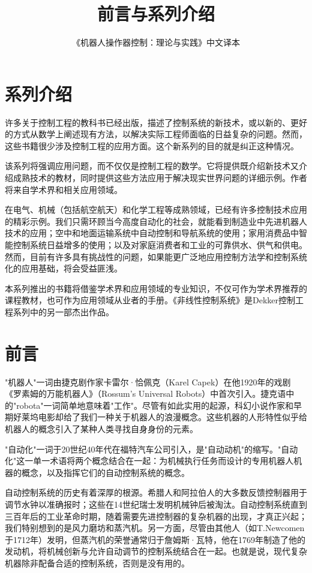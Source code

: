 \documentclass[UTF8,a4paper]{ctexart}
\title{前言与系列介绍}
\author{《机器人操作器控制：理论与实践》中文译本}
\date{}
\begin{document}
  \maketitle
\fi

\section{系列介绍}

许多关于控制工程的教科书已经出版，描述了控制系统的新技术，或以新的、更好的方式从数学上阐述现有方法，以解决实际工程师面临的日益复杂的问题。然而，这些书籍很少涉及控制工程的应用方面。这个新系列的目的就是纠正这种情况。

该系列将强调应用问题，而不仅仅是控制工程的数学。它将提供既介绍新技术又介绍成熟技术的教材，同时提供这些方法应用于解决现实世界问题的详细示例。作者将来自学术界和相关应用领域。

在电气、机械（包括航空航天）和化学工程等成熟领域，已经有许多控制技术应用的精彩示例。我们只需环顾当今高度自动化的社会，就能看到制造业中先进机器人技术的应用；空中和地面运输系统中自动控制和导航系统的使用；家用消费品中智能控制系统日益增多的使用；以及对家庭消费者和工业的可靠供水、供气和供电。然而，目前有许多具有挑战性的问题，如果能更广泛地应用控制方法学和控制系统化的应用基础，将会受益匪浅。

本系列推出的书籍将借鉴学术界和应用领域的专业知识，不仅可作为学术界推荐的课程教材，也可作为应用领域从业者的手册。《非线性控制系统》是Dekker控制工程系列中的另一部杰出作品。

\section{前言}

"机器人"一词由捷克剧作家卡雷尔·恰佩克（Karel Capek）在他1920年的戏剧《罗素姆的万能机器人》（Rossum's Universal Robots）中首次引入。捷克语中的"robota"一词简单地意味着"工作"。尽管有如此实用的起源，科幻小说作家和早期好莱坞电影却给了我们一种关于机器人的浪漫概念。这些机器的人形特性似乎给机器人的概念引入了某种人类寻找自身身份的元素。

"自动化"一词于20世纪40年代在福特汽车公司引入，是"自动动机"的缩写。"自动化"这一单一术语将两个概念结合在一起：为机械执行任务而设计的专用机器人机器的概念，以及指挥它们的自动控制系统的概念。

自动控制系统的历史有着深厚的根源。希腊人和阿拉伯人的大多数反馈控制器用于调节水钟以准确报时；这些在14世纪瑞士发明机械钟后被淘汰。自动控制系统直到三百年后的工业革命时期，随着需要先进控制器的复杂机器的出现，才真正兴起；我们特别想到的是风力磨坊和蒸汽机。另一方面，尽管由其他人（如T.Newcomen于1712年）发明，但蒸汽机的荣誉通常归于詹姆斯·瓦特，他在1769年制造了他的发动机，将机械创新与允许自动调节的控制系统结合在一起。也就是说，现代复杂机器除非配备合适的控制系统，否则是没有用的。
\end{document}
